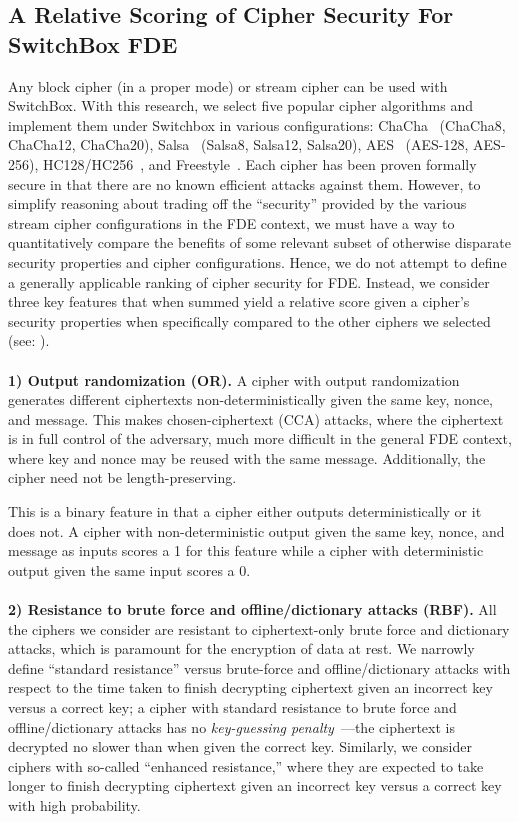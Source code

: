 \subsection{A Relative Scoring of Cipher Security For SwitchBox FDE}

Any block cipher (in a proper mode) or stream cipher can be used with SwitchBox.
With this research, we select five popular cipher algorithms and implement them
under Switchbox in various configurations: ChaCha~\cite{ChaCha20} (ChaCha8,
ChaCha12, ChaCha20), Salsa~\cite{SalsaX} (Salsa8, Salsa12, Salsa20),
AES~\cite{AES} (AES-128, AES-256), HC128/HC256~\cite{HCX}, and
Freestyle~\cite{Freestyle}. Each cipher has been proven formally secure in that
there are no known efficient attacks against them. However, to simplify
reasoning about trading off the ``security'' provided by the various stream
cipher configurations in the FDE context, we must have a way to quantitatively
compare the benefits of some relevant subset of otherwise disparate security
properties and cipher configurations. Hence, we do not attempt to define a
generally applicable ranking of cipher security for FDE. Instead, we consider
three key features that when summed yield a relative score given a cipher's
security properties when specifically compared to the other ciphers we selected
(see: ).\\
\\
\textbf{1) Output randomization (OR).} A cipher with output randomization
generates different ciphertexts non-deterministically given the same key,
nonce, and message. This makes chosen-ciphertext (CCA) attacks, where the
ciphertext is in full control of the adversary, much more difficult in the
general FDE context, where key and nonce may be reused with the same message.
Additionally, the cipher need not be length-preserving.

This is a binary feature in that a cipher either outputs deterministically or
it does not. A cipher with non-deterministic output given the same key, nonce,
and message as inputs scores a 1 for this feature while a cipher with
deterministic output given the same input scores a 0.\\
\\
\textbf{2) Resistance to brute force and offline/dictionary attacks (RBF).}
All the ciphers we consider are resistant to ciphertext-only brute force and
dictionary attacks, which is paramount for the encryption of data at rest. We
narrowly define ``standard resistance'' versus brute-force and
offline/dictionary attacks with respect to the time taken to finish decrypting
ciphertext given an incorrect key versus a correct key; a cipher with standard
resistance to brute force and offline/dictionary attacks has no
\emph{key-guessing penalty}~\cite{Freestyle}---the ciphertext is decrypted no
slower than when given the correct key. Similarly, we consider ciphers with
so-called ``enhanced resistance,'' where they are expected to take longer to
finish decrypting ciphertext given an incorrect key versus a correct key with
high probability.

